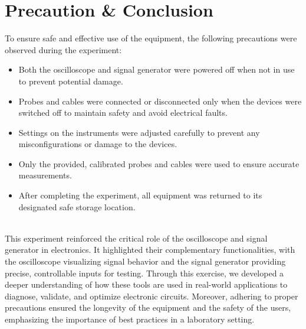 \documentclass[12pt]{article}
\begin{document}
\section*{Precaution \& Conclusion}
To ensure safe and effective use of the equipment, the following precautions were observed during the experiment:
\begin{itemize}
    \item Both the oscilloscope and signal generator were powered off when not in use to prevent potential damage.
    \item Probes and cables were connected or disconnected only when the devices were switched off to maintain safety and avoid electrical faults.
    \item Settings on the instruments were adjusted carefully to prevent any misconfigurations or damage to the devices.
    \item Only the provided, calibrated probes and cables were used to ensure accurate measurements.
    \item After completing the experiment, all equipment was returned to its designated safe storage location.\\\\
\end{itemize}
This experiment reinforced the critical role of the oscilloscope and signal generator in electronics. It highlighted their complementary functionalities, with the oscilloscope visualizing signal behavior and the signal generator providing precise, controllable inputs for testing. Through this exercise, we developed a deeper understanding of how these tools are used in real-world applications to diagnose, validate, and optimize electronic circuits. Moreover, adhering to proper precautions ensured the longevity of the equipment and the safety of the users, emphasizing the importance of best practices in a laboratory setting.


\renewcommand{\bibname}{References}

\end{document}
